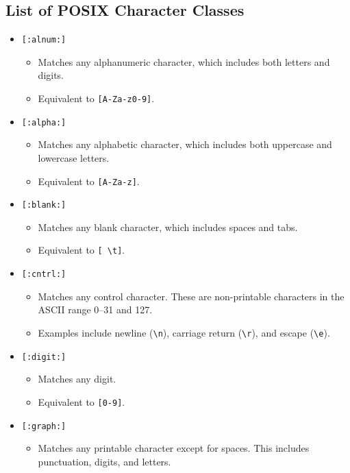 \documentclass{report}
\begin{document}
\subsection{List of POSIX Character Classes}
\begin{itemize}
    \item \texttt{[:alnum:]}
        \begin{itemize}
            \item Matches any alphanumeric character, which includes both letters and digits.
            \item Equivalent to \texttt{[A-Za-z0-9]}.
        \end{itemize}
    \item \texttt{[:alpha:]}
        \begin{itemize}
            \item Matches any alphabetic character, which includes both uppercase and lowercase letters.
            \item Equivalent to \texttt{[A-Za-z]}.
        \end{itemize}
    \item \texttt{[:blank:]}
        \begin{itemize}
            \item Matches any blank character, which includes spaces and tabs.
            \item Equivalent to \texttt{[ \textbackslash{}t]}.
        \end{itemize}
    \item \texttt{[:cntrl:]}
        \begin{itemize}
            \item Matches any control character. These are non-printable characters in the ASCII range 0–31 and 127.
            \item Examples include newline (\texttt{\textbackslash{}n}), carriage return (\texttt{\textbackslash{}r}), and escape (\texttt{\textbackslash{}e}).
        \end{itemize}
    \item \texttt{[:digit:]}
        \begin{itemize}
            \item Matches any digit.
            \item Equivalent to \texttt{[0-9]}.
        \end{itemize}
    \item \texttt{[:graph:]}
        \begin{itemize}
            \item Matches any printable character except for spaces. This includes punctuation, digits, and letters.

\end{itemize}
\end{itemize}
\end{document}
